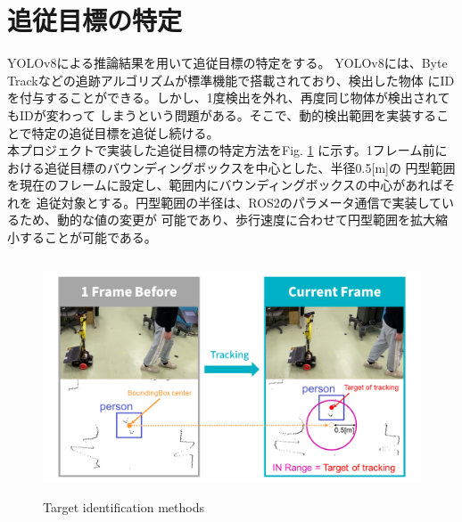 \section{追従目標の特定}
YOLOv8による推論結果を用いて追従目標の特定をする。
YOLOv8には、Byte Trackなどの追跡アルゴリズムが標準機能で搭載されており、検出した物体
にIDを付与することができる。しかし、1度検出を外れ、再度同じ物体が検出されてもIDが変わって
しまうという問題がある。そこで、動的検出範囲を実装することで特定の追従目標を追従し続ける。\\ \indent
本プロジェクトで実装した追従目標の特定方法をFig. \ref{Target identification methods}
に示す。1フレーム前における追従目標のバウンディングボックスを中心とした、半径0.5[m]の
円型範囲を現在のフレームに設定し、範囲内にバウンディングボックスの中心があればそれを
追従対象とする。円型範囲の半径は、ROS2のパラメータ通信で実装しているため、動的な値の変更が
可能であり、歩行速度に合わせて円型範囲を拡大縮小することが可能である。

\begin{figure}[h]
    \begin{center}
    \includegraphics[height=70mm,clip]{figure/Target-identification-methods.png}
    \caption{Target identification methods}
    \label{Target identification methods}
    \end{center}
\end{figure}

